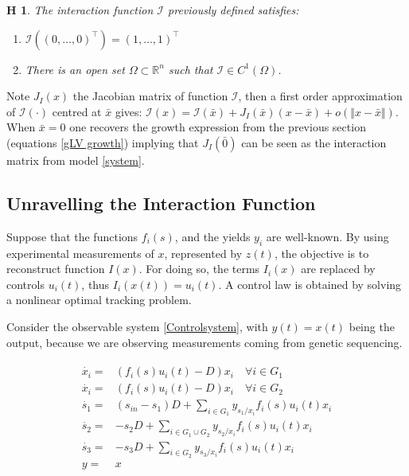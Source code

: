 \documentclass[processes,article,submit,moreauthors,pdftex]{Definitions/mdpi}
\newcommand{\R}{\mathbb{R}}
\newcommand{\I}{\mathcal{I}}
\newtheorem{hypo}{H}
\begin{document}
\begin{hypo}
	The interaction function $\I$ previously defined satisfies:
	\begin{enumerate}
		\item $	\I \left( (0,\dots,0)^\top \right) = (1,\dots,1)^\top $
		\item There is an open set $\Omega \subset \R^n $ such that $\I \in C^1(\Omega)$.
	\end{enumerate} 
\end{hypo}


Note $J_I(x)$ the Jacobian matrix of function $\mathcal{I}$, then a first order approximation of $\I(\cdot)$ centred at $\bar{x}$ gives: $\I(x) = \I(\bar{x}) + J_I(\bar{x})(x-\bar{x}) + o(\Vert x- \bar{x} \Vert)$. When $\bar{x}= 0$ one recovers the growth expression from the previous section (equations \eqref{gLV growth}) implying that $J_I(\bar{0})$ can be seen as the interaction matrix from model \eqref{system}.

\subsection{Unravelling the Interaction Function}

Suppose that the functions $f_i(s)$, and the yields $y_i$ are well-known. By using experimental measurements of $x$, represented by $z(t)$, the objective is to reconstruct function $I(x)$. For doing so, the terms $I_i(x)$ are replaced by controls $u_i(t)$, thus $I_i(x(t)) = u_i(t)$. A control law is obtained by solving a nonlinear optimal tracking problem.	

Consider the observable system \eqref{Controlsystem}, with $y(t) = x(t)$ being the output, because we are observing measurements coming from genetic sequencing.

\begin{align} 
\label{Controlsystem}
\begin{array}{cl}
\dot{x_i} =& \left(f_i(s)u_i(t) -D \right)x_i \quad \forall i \in G_1\\
\dot{x_i} =& \left(f_i(s)u_i(t) -D \right)x_i \quad \forall i \in G_2\\
\dot{s_1} =& \displaystyle (s_{in}-s_1)D + \sum\limits_{i \in G_1}y_{s_1/x_i}f_i(s)u_i(t) x_i  \\
\dot{s_2} = & \displaystyle -s_2D+\sum\limits_{i \in G_1 \cup G_2}y_{s_2/x_i}f_i(s)u_i(t)x_i  \\
\dot{s_3} =&  \displaystyle -s_3D+\sum\limits_{i \in G_2}y_{s_3/x_i}f_i(s)u_i(t) x_i \\
y  =& x
\end{array}
\end{align}	
\end{document}
